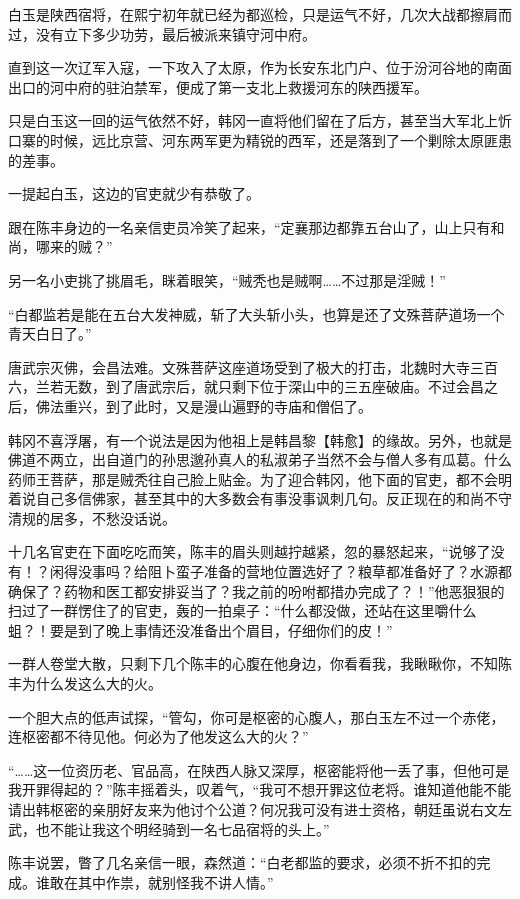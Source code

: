 白玉是陕西宿将，在熙宁初年就已经为都巡检，只是运气不好，几次大战都擦肩而过，没有立下多少功劳，最后被派来镇守河中府。

直到这一次辽军入寇，一下攻入了太原，作为长安东北门户、位于汾河谷地的南面出口的河中府的驻泊禁军，便成了第一支北上救援河东的陕西援军。

只是白玉这一回的运气依然不好，韩冈一直将他们留在了后方，甚至当大军北上忻口寨的时候，远比京营、河东两军更为精锐的西军，还是落到了一个剿除太原匪患的差事。

一提起白玉，这边的官吏就少有恭敬了。

跟在陈丰身边的一名亲信吏员冷笑了起来，“定襄那边都靠五台山了，山上只有和尚，哪来的贼？”

另一名小吏挑了挑眉毛，眯着眼笑，“贼秃也是贼啊……不过那是淫贼！”

“白都监若是能在五台大发神威，斩了大头斩小头，也算是还了文殊菩萨道场一个青天白日了。”

唐武宗灭佛，会昌法难。文殊菩萨这座道场受到了极大的打击，北魏时大寺三百六，兰若无数，到了唐武宗后，就只剩下位于深山中的三五座破庙。不过会昌之后，佛法重兴，到了此时，又是漫山遍野的寺庙和僧侣了。

韩冈不喜浮屠，有一个说法是因为他祖上是韩昌黎【韩愈】的缘故。另外，也就是佛道不两立，出自道门的孙思邈孙真人的私淑弟子当然不会与僧人多有瓜葛。什么药师王菩萨，那是贼秃往自己脸上贴金。为了迎合韩冈，他下面的官吏，都不会明着说自己多信佛家，甚至其中的大多数会有事没事讽刺几句。反正现在的和尚不守清规的居多，不愁没话说。

十几名官吏在下面吃吃而笑，陈丰的眉头则越拧越紧，忽的暴怒起来，“说够了没有！？闲得没事吗？给阻卜蛮子准备的营地位置选好了？粮草都准备好了？水源都确保了？药物和医工都安排妥当了？我之前的吩咐都措办完成了？！”他恶狠狠的扫过了一群愣住了的官吏，轰的一拍桌子：“什么都没做，还站在这里嚼什么蛆？！要是到了晚上事情还没准备出个眉目，仔细你们的皮！”

一群人卷堂大散，只剩下几个陈丰的心腹在他身边，你看看我，我瞅瞅你，不知陈丰为什么发这么大的火。

一个胆大点的低声试探，“管勾，你可是枢密的心腹人，那白玉左不过一个赤佬，连枢密都不待见他。何必为了他发这么大的火？”

“……这一位资历老、官品高，在陕西人脉又深厚，枢密能将他一丢了事，但他可是我开罪得起的？”陈丰摇着头，叹着气，“我可不想开罪这位老将。谁知道他能不能请出韩枢密的亲朋好友来为他讨个公道？何况我可没有进士资格，朝廷虽说右文左武，也不能让我这个明经骑到一名七品宿将的头上。”

陈丰说罢，瞥了几名亲信一眼，森然道：“白老都监的要求，必须不折不扣的完成。谁敢在其中作祟，就别怪我不讲人情。”
